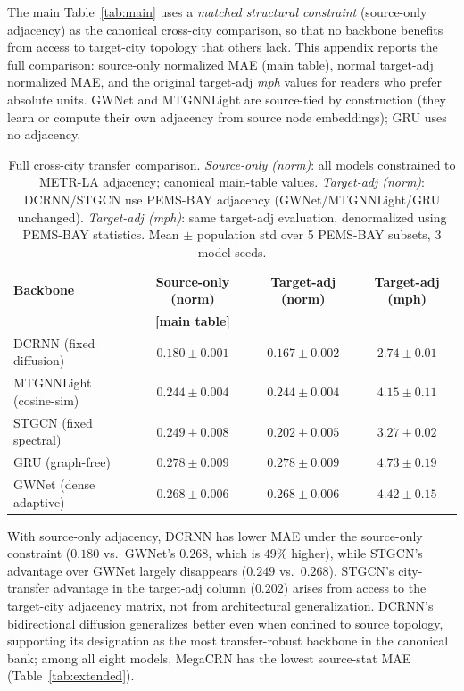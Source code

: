 The main Table~\ref{tab:main} uses a \emph{matched structural constraint} (source-only
adjacency) as the canonical cross-city comparison, so that no backbone benefits from
access to target-city topology that others lack.
This appendix reports the full comparison: source-only normalized MAE (main table),
normal target-adj normalized MAE, and the original target-adj \emph{mph} values for
readers who prefer absolute units.
GWNet and MTGNNLight are source-tied by construction (they learn or compute their own
adjacency from source node embeddings); GRU uses no adjacency.

\begin{table}[h]
\centering
\caption{Full cross-city transfer comparison.
\emph{Source-only (norm)}: all models constrained to METR-LA adjacency; canonical main-table values.
\emph{Target-adj (norm)}: DCRNN/STGCN use PEMS-BAY adjacency (GWNet/MTGNNLight/GRU unchanged).
\emph{Target-adj (mph)}: same target-adj evaluation, denormalized using PEMS-BAY statistics.
Mean $\pm$ population std over 5 PEMS-BAY subsets, 3 model seeds.}
\label{tab:source_adj_control}
\vskip 0.1in
\small
\begin{tabular}{lccc}
\toprule
\textbf{Backbone} & \textbf{Source-only (norm)} & \textbf{Target-adj (norm)} & \textbf{Target-adj (mph)} \\
 & \textbf{[main table]} & & \\
\midrule
DCRNN (fixed diffusion) & $0.180 \pm 0.001$ & $0.167 \pm 0.002$ & $2.74 \pm 0.01$ \\
MTGNNLight (cosine-sim) & $0.244 \pm 0.004$ & $0.244 \pm 0.004$ & $4.15 \pm 0.11$ \\
STGCN (fixed spectral)  & $0.249 \pm 0.008$ & $0.202 \pm 0.005$ & $3.27 \pm 0.02$ \\
GRU   (graph-free)      & $0.278 \pm 0.009$ & $0.278 \pm 0.009$ & $4.73 \pm 0.19$ \\
GWNet (dense adaptive)  & $0.268 \pm 0.006$ & $0.268 \pm 0.006$ & $4.42 \pm 0.15$ \\
\bottomrule
\end{tabular}
\end{table}

With source-only adjacency,
DCRNN has lower MAE under the source-only constraint
($0.180$ vs.\ GWNet's $0.268$, which is $49\%$ higher), while STGCN's advantage over GWNet
largely disappears ($0.249$ vs.\ $0.268$).
STGCN's city-transfer advantage in the target-adj column ($0.202$) arises
from access to the target-city adjacency matrix, not from architectural generalization.
DCRNN's bidirectional diffusion generalizes better even when confined to source topology,
supporting its designation as the most transfer-robust backbone in the
canonical bank; among all eight models, MegaCRN has the lowest source-stat
MAE (Table~\ref{tab:extended}).

